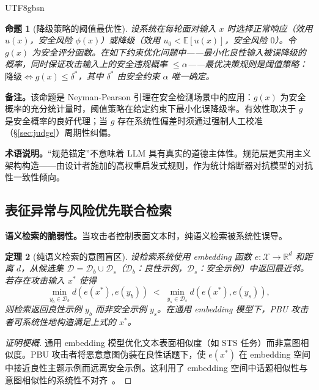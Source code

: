 \documentclass[letterpaper,twocolumn,10pt]{article}
\newtheorem{theorem}{定理}[section]
\newtheorem{proposition}[theorem]{命题}
\begin{document}
\begin{CJK}{UTF8}{gbsn}
\begin{proposition}[降级策略的阈值最优性]
\label{prop:degradation-optimal}
设系统在每轮面对输入 $x$ 时选择正常响应（效用 $u(x)$，安全风险 $\phi(x)$）或降级（效用 $u_0 < \mathbb{E}[u(x)]$，安全风险 $0$）。令 $g(x)$ 为安全评分函数。在如下约束优化问题中——最小化良性输入被误降级的概率，同时保证攻击输入上的安全违规概率 $\leq \alpha$——最优决策规则是阈值策略：$\text{降级} \iff g(x) \leq \delta^*$，其中 $\delta^*$ 由安全约束 $\alpha$ 唯一确定。
\end{proposition}

\noindent\textbf{备注。}该命题是 Neyman-Pearson 引理在安全检测场景中的应用：$g(x)$ 为安全概率的充分统计量时，阈值策略在给定约束下最小化误降级率。有效性取决于 $g$ 是安全概率的良好代理；当 $g$ 存在系统性偏差时须通过强制人工校准（\S\ref{sec:judge}）周期性纠偏。

\noindent\textbf{术语说明。}``规范锚定''不意味着 LLM 具有真实的道德主体性。规范层是实用主义架构构造——由设计者施加的高权重启发式规则，作为统计熔断器对抗模型的对抗性一致性倾向。

\subsection{表征异常与风险优先联合检索}
\label{sec:paradigm-representation}

\textbf{语义检索的脆弱性。}当攻击者控制表面文本时，纯语义检索被系统性误导。

\begin{theorem}[纯语义检索的意图盲区]
\label{thm:retrieval-fail}
设检索系统使用 embedding 函数 $e\!: \mathcal{X} \to \mathbb{R}^d$ 和距离 $d$，从候选集 $\mathcal{D} = \mathcal{D}_b \cup \mathcal{D}_s$（$\mathcal{D}_b$：良性示例，$\mathcal{D}_s$：安全示例）中返回最近邻。若存在攻击输入 $x^*$ 使得
\begin{equation}
\min_{y_b \in \mathcal{D}_b} d(e(x^*), e(y_b)) \;<\; \min_{y_s \in \mathcal{D}_s} d(e(x^*), e(y_s)),
\end{equation}
则检索返回良性示例 $y_b$ 而非安全示例 $y_s$。在通用 embedding 模型下，PBU 攻击者可系统性地构造满足上式的 $x^*$。
\end{theorem}

\begin{proof}[证明梗概]
通用 embedding 模型优化文本表面相似度（如 STS 任务）而非意图相似度。PBU 攻击者将恶意意图伪装在良性话题下，使 $e(x^*)$ 在 embedding 空间中接近良性主题示例而远离安全示例。这利用了 embedding 空间中话题相似性与意图相似性的系统性不对齐~\cite{pbu-reconstruct}。
\end{proof}


\end{CJK}
\end{document}
